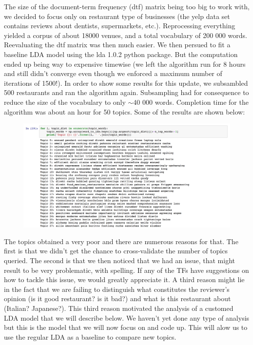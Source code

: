 \documentclass[paper=a4, fontsize=11pt]{scrartcl} %
\numberwithin{equation}{section}
\numberwithin{figure}{section}
\numberwithin{table}{section}
\begin{document}
The size of the document-term frequency (dtf) matrix being too big to work with, we decided to focus only on restaurant type of businesses (the yelp data set contains reviews about dentists, supermarkets, etc.). Reprocessing everything yielded a corpus of about 18000 venues, and a total vocabulary of 200 000 words. Reevaluating the dtf matrix was then much easier. We then persued to fit a baseline LDA model using the lda 1.0.2 python package. But the computation ended up being way to expensive timewise (we left the algorithm run for 8 hours and still didn't converge even though we enforced a maximum number of iterations of 1500!). In order to show some results for this update, we subsambled 500 restaurants and ran the algorithm again. Subsampling had for consequence to reduce the size of the vocabulary to only $\sim$40 000 words. Completion time for the algorithm was about an hour for 50 topics. Some of the results are shown below:

\begin{figure}[h!]
\centering
\includegraphics[width=1\textwidth]{first_topics.png}
\end{figure}

The topics obtained a very poor and there are numerous reasons for that. The first is that we didn't get the chance to cross-validate the number of topics queried. The second is that we then noticed that we had an issue, that might result to be very problematic, with spelling. If any of the TFs have suggestions on how to tackle this issue, we would greatly appreciate it. A third reason might lie in the fact that we are failing to distinguish what constitutes the reviewer's opinion (is it good restaurant? is it bad?) and what is this restaurant about (Italian? Japanese?). This third reason motivated the analysis of a customed LDA model that we will describe below. We haven't yet done any type of analysis but this is the model that we will now focus on and code up. This will alow us to use the regular LDA as a baseline to compare new topics.\\
\end{document}
